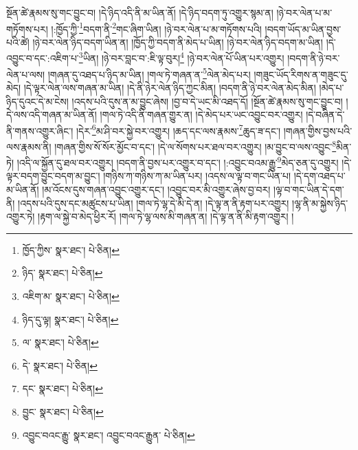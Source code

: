 སྔོན་ཚེ་རྣམས་སུ་གང་བྱུང་བ། །དེ་ཉིད་འདི་ནི་མ་ཡིན་ནོ། །དེ་ཉིད་བདག་ཏུ་འགྱུར་སྙམ་ན། །ཉེ་བར་ལེན་པ་མ་གཏོགས་པར། །:ཁྱོད་ཀྱི་\footnote{ཁྱོད་ཀྱིས་  སྣར་ཐང་།  པེ་ཅིན། }བདག་ནི་\footnote{ཉིད་  སྣར་ཐང་།  པེ་ཅིན། }གང་ཞིག་ཡིན། །ཉེ་བར་ལེན་པ་མ་གཏོགས་པའི། །བདག་ཡོད་མ་ཡིན་བྱས་པའི་ཚེ། །ཉེ་བར་ལེན་ཉིད་བདག་ཡིན་ན། །ཁྱོད་ཀྱི་བདག་ནི་མེད་པ་ཡིན། །ཉེ་བར་ལེན་ཉིད་བདག་མ་ཡིན། །དེ་འབྱུང་བ་དང་:འཇིག་པ་\footnote{འཇིག་མ་  སྣར་ཐང་།  པེ་ཅིན། }ཡིན། །ཉེ་བར་བླང་བ་:ཇི་ལྟ་བུར།\footnote{ཉིད་དུ་ལྟ།  སྣར་ཐང་།  པེ་ཅིན། } །ཉེ་བར་ལེན་པོ་ཡིན་པར་འགྱུར། །བདག་ནི་ཉེ་བར་ལེན་པ་ལས། །གཞན་དུ་འཐད་པ་ཉིད་མ་ཡིན། །གལ་ཏེ་གཞན་ན་\footnote{ལ་  སྣར་ཐང་།  པེ་ཅིན། }ལེན་མེད་པར། །གཟུང་ཡོད་རིགས་ན་གཟུང་དུ་མེད། །དེ་ལྟར་ལེན་ལས་གཞན་མ་ཡིན། །དེ་ནི་ཉེར་ལེན་ཉིད་ཀྱང་མིན། །བདག་ནི་ཉེ་བར་ལེན་མེད་མིན། །མེད་པ་ཉིད་དུའང་དེ་མ་ངེས། །འདས་པའི་དུས་ན་མ་བྱུང་ཞེས། །བྱ་བ་དེ་ཡང་མི་འཐད་དོ། །སྔོན་ཚེ་རྣམས་སུ་གང་བྱུང་བ། །དེ་ལས་འདི་གཞན་མ་ཡིན་ནོ། །གལ་ཏེ་འདི་ནི་གཞན་གྱུར་ན། །དེ་མེད་པར་ཡང་འབྱུང་བར་འགྱུར། །དེ་བཞིན་དེ་ནི་གནས་འགྱུར་ཞིང་། །དེར་\footnote{དེ་  སྣར་ཐང་།  པེ་ཅིན། }མ་ཤི་བར་སྐྱེ་བར་འགྱུར། །ཆད་དང་ལས་རྣམས་\footnote{དང་  སྣར་ཐང་།  པེ་ཅིན། }ཆུད་ཟ་དང་། །གཞན་གྱིས་བྱས་པའི་ལས་རྣམས་ནི། །གཞན་གྱིས་སོ་སོར་མྱོང་བ་དང་། །དེ་ལ་སོགས་པར་ཐལ་བར་འགྱུར། །མ་བྱུང་བ་ལས་འབྱུང་\footnote{བྱུང་  སྣར་ཐང་།  པེ་ཅིན། }མིན་ཏེ། །འདི་ལ་སྐྱོན་དུ་ཐལ་བར་འགྱུར། །བདག་ནི་བྱས་པར་འགྱུར་བ་དང་། །:འབྱུང་བའམ་རྒྱུ་\footnote{འབྱུང་བའང་རྒྱུ་  སྣར་ཐང་། འབྱུང་བའང་རྒྱུན་  པེ་ཅིན། }མེད་ཅན་དུ་འགྱུར། །དེ་ལྟར་བདག་བྱུང་བདག་མ་བྱུང་། །གཉིས་ཀ་གཉིས་ཀ་མ་ཡིན་པར། །འདས་ལ་ལྟ་བ་གང་ཡིན་པ། །དེ་དག་འཐད་པ་མ་ཡིན་ནོ། །མ་འོངས་དུས་གཞན་འབྱུང་འགྱུར་དང་། །འབྱུང་བར་མི་འགྱུར་ཞེས་བྱ་བར། །ལྟ་བ་གང་ཡིན་དེ་དག་ནི། །འདས་པའི་དུས་དང་མཚུངས་པ་ཡིན། །གལ་ཏེ་ལྷ་དེ་མི་དེ་ན། །དེ་ལྟ་ན་ནི་རྟག་པར་འགྱུར། །ལྷ་ནི་མ་སྐྱེས་ཉིད་འགྱུར་ཏེ། །རྟག་ལ་སྐྱེ་བ་མེད་ཕྱིར་རོ། །གལ་ཏེ་ལྷ་ལས་མི་གཞན་ན། །དེ་ལྟ་ན་ནི་མི་རྟག་འགྱུར། །
